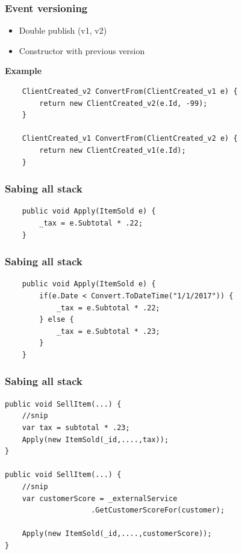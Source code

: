 \documentclass{beamer}
\begin{document}
\begin{frame}[fragile]

    \frametitle{\textbf{Event versioning}}
    \begin{itemize}
        \item Double publish (v1, v2)
        \item Constructor with previous version
    \end{itemize}
    \vskip 3mm
    \begin{flushleft}
        \textbf{Example}
    \end{flushleft}
    
    \begin{lstlisting}
    ClientCreated_v2 ConvertFrom(ClientCreated_v1 e) {
        return new ClientCreated_v2(e.Id, -99);
    }

    ClientCreated_v1 ConvertFrom(ClientCreated_v2 e) {
        return new ClientCreated_v1(e.Id);
    }\end{lstlisting}

\end{frame}

\begin{frame}[fragile]

    \frametitle{\textbf{Sabing all stack}}
    \begin{lstlisting}
    public void Apply(ItemSold e) {
        _tax = e.Subtotal * .22;
    }\end{lstlisting}

\end{frame}

\begin{frame}[fragile]

    \frametitle{\textbf{Sabing all stack}}
    \begin{lstlisting}
    public void Apply(ItemSold e) {
        if(e.Date < Convert.ToDateTime("1/1/2017")) {
            _tax = e.Subtotal * .22;
        } else {
            _tax = e.Subtotal * .23;
        }
    }\end{lstlisting}

\end{frame}

\begin{frame}[fragile]

    \frametitle{\textbf{Sabing all stack}}
    \begin{lstlisting}
public void SellItem(...) {
    //snip
    var tax = subtotal * .23;
    Apply(new ItemSold(_id,....,tax));
}

public void SellItem(...) {
    //snip
    var customerScore = _externalService
                    .GetCustomerScoreFor(customer);

    Apply(new ItemSold(_id,....,customerScore));
}\end{lstlisting}

\end{frame}
\end{document}
